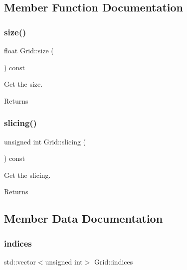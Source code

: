\subsection{Member Function Documentation}
\mbox{\label{classGrid_a5b900bea5220f07c95ea99cce2d7c2a9}} 
\subsubsection{\texorpdfstring{size()}{size()}}
{\footnotesize\ttfamily float Grid\+::size (\begin{DoxyParamCaption}{ }\end{DoxyParamCaption}) const\hspace{0.3cm}{\ttfamily [inline]}}



Get the size. 

\begin{DoxyReturn}{Returns}

\end{DoxyReturn}
\mbox{\label{classGrid_a8f3f213939fd848aba1bcd369defe7a3}} 
\subsubsection{\texorpdfstring{slicing()}{slicing()}}
{\footnotesize\ttfamily unsigned int Grid\+::slicing (\begin{DoxyParamCaption}{ }\end{DoxyParamCaption}) const\hspace{0.3cm}{\ttfamily [inline]}}



Get the slicing. 

\begin{DoxyReturn}{Returns}

\end{DoxyReturn}


\subsection{Member Data Documentation}
\mbox{\label{classGrid_a057222ca5900838736127c9665b1dd63}} 
\subsubsection{\texorpdfstring{indices}{indices}}
{\footnotesize\ttfamily std\+::vector$<$unsigned int$>$ Grid\+::indices}



